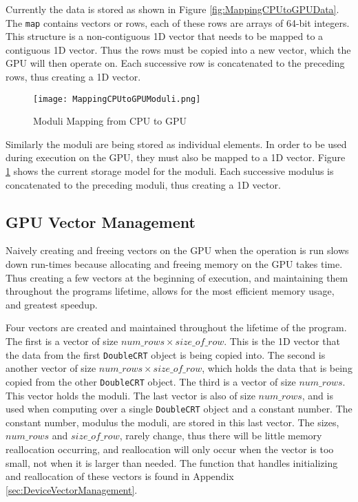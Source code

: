 Currently the data is stored as shown in Figure \ref{fig:MappingCPUtoGPUData}. The \verb|map| contains vectors or rows, each of these rows are arrays of 64-bit integers. This structure is a non-contiguous 1D vector that needs to be mapped to a contiguous 1D vector. Thus the rows must be copied into a new vector, which the GPU will then operate on. Each successive row is concatenated to the preceding rows, thus creating a 1D vector.

\begin{figure}[htp]
\centering
\texttt{[image: MappingCPUtoGPUModuli.png]}
\caption{Moduli Mapping from CPU to GPU}
\label{fig:MappingCPUtoGPUModuli}
\end{figure}

Similarly the moduli are being stored as individual elements. In order to be used during execution on the GPU, they must also be mapped to a 1D vector. Figure \ref{fig:MappingCPUtoGPUModuli} shows the current storage model for the moduli. Each successive modulus is concatenated to the preceding moduli, thus creating a 1D vector.

\subsection{GPU Vector Management}
Naively creating and freeing vectors on the GPU when the operation is run slows down run-times because allocating and freeing memory on the GPU takes time. Thus creating a few vectors at the beginning of execution, and maintaining them throughout the programs lifetime, allows for the most efficient memory usage, and greatest speedup.

Four vectors are created and maintained throughout the lifetime of the program. The first is a vector of size $num\_rows \times size\_of\_row$. This is the 1D vector that the data from the first \verb|DoubleCRT| object is being copied into. The second is another vector of size $num\_rows \times size\_of\_row$, which holds the data that is being copied from the other \verb|DoubleCRT| object. The third is a vector of size $num\_rows$. This vector holds the moduli. The last vector is also of size $num\_rows$, and is used when computing over a single \verb|DoubleCRT| object and a constant number. The constant number, modulus the moduli, are stored in this last vector. The sizes, $num\_rows$ and $size\_of\_row$, rarely change, thus there will be little memory reallocation occurring, and reallocation will only occur when the vector is too small, not when it is larger than needed. The function that handles initializing and reallocation of these vectors is found in Appendix \ref{sec:DeviceVectorManagement}.

